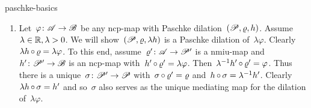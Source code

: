 \begin{solution}{paschke-basics}
\begin{enumerate}
\item
Let~$\varphi\colon \mathscr{A} \to \mathscr{B}$ be any ncp-map
    with Paschke dilation~$(\mathscr{P}, \varrho, h)$.
Assume~$\lambda \in \mathbb{R}, \lambda > 0$.
We will show~$(\mathscr{P}, \varrho, \lambda h)$
    is a Paschke dilation of~$\lambda \varphi$.
Clearly~$\lambda h \mathop{\circ} \varrho = \lambda \varphi$.
To this end, assume~$\varrho'\colon \mathscr{A} \to \mathscr{P}'$ is a nmiu-map
    and~$h' \colon \mathscr{P}' \to \mathscr{B}$ is an ncp-map
    with~$h' \mathop{\circ} \varrho' = \lambda \varphi$.
Then~$\lambda^{-1} h' \mathop{\circ} \varrho' = \varphi $.
Thus there is a unique~$\sigma\colon \mathscr{P}' \to \mathscr{P}$
    with~$\sigma \mathop{\circ} \varrho' = \varrho$
    and~$h \mathop{\circ} \sigma = \lambda^{-1} h'$.
Clearly~$\lambda h \mathop{\circ} \sigma = h'$ and so~$\sigma$
    also serves as the unique mediating map
    for the dilation of~$\lambda \varphi$.
\end{enumerate}
\end{solution}
\spacingfix
